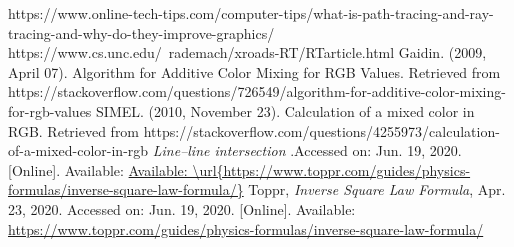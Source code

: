 \documentclass[conference]{IEEEtran}
\begin{document}
\begin{thebibliography}{00}
 https://www.online-tech-tips.com/computer-tips/what-is-path-tracing-and-ray-tracing-and-why-do-they-improve-graphics/
 https://www.cs.unc.edu/~rademach/xroads-RT/RTarticle.html
 Gaidin. (2009, April 07). Algorithm for Additive Color Mixing for RGB Values. Retrieved from https://stackoverflow.com/questions/726549/algorithm-for-additive-color-mixing-for-rgb-values
 SIMEL. (2010, November 23). Calculation of a mixed color in RGB. Retrieved from https://stackoverflow.com/questions/4255973/calculation-of-a-mixed-color-in-rgb
 \textit{Line–line intersection} .Accessed on: Jun. 19, 2020. [Online]. Available: \url{Available: \url{https://www.toppr.com/guides/physics-formulas/inverse-square-law-formula/}}
 Toppr, \textit{Inverse Square Law Formula}, Apr. 23, 2020. Accessed on: Jun. 19, 2020. [Online]. Available: \url{https://www.toppr.com/guides/physics-formulas/inverse-square-law-formula/}
\begin{comment}
\bibitem{b1} J. L\'azaro, \textit{Backtracking}, Departamento de Ciencias de la Computaci\'on, Universidad de Alcal\'a, n.d. Accessed on: Mar. 18, 2020. [Online]. Available: \url{ftp://www.cc.uah.es/pub/Alumnos/G_Ing_Informatica/Algoritmia_y_Complejidad/anteriores/Apuntes/08_Backtracking.pdf}
\bibitem{b2} “Nonogram”, n.d. Accessed on: Mar. 18, 2020. [Online]. Available: \url{https://www.definitions.net/definition/Nonogram}
\bibitem{b3}  C. Wu , D. Sun, L. Chen, K. Chen, C. Kuo, H. Kang and H. Lin, "An Efficient Approach to Solving Nonograms", \textit{IEEE Transactions On Computational Intelligence And AI In Games}, vol. 5. no. 3, Sept. 2013,  pp. 251-264. Accessed on: Mar. 18, 2020. [Online]. Available: \url{http://perpustakaan.unitomo.ac.id/repository/An Efficient Approach to Solving Nonograms.pdf}
\bibitem{b4} Tech With Tim, \textit{Python Sudoku Solver Tutorial with Backtracking p.2}, Apr. 4, 2019. Accessed on: Mar. 18, 2020. [Video file]. Available: \url{https://www.youtube.com/watch?v=lK4N8E6uNr4&t=844s}
\bibitem{b5} M. Richards, \textit{Backtracking Algorithms in MCPL using Bit Patterns and Recursion}, Computer Laboratory, University of Cambridge, Feb. 23, 2009. Accessed on: Mar. 18, 2020. [Online]. Available: \url{https://www.cl.cam.ac.uk/~mr10/backtrk.pdf}
\end{comment}
\end{thebibliography}
\end{document}
